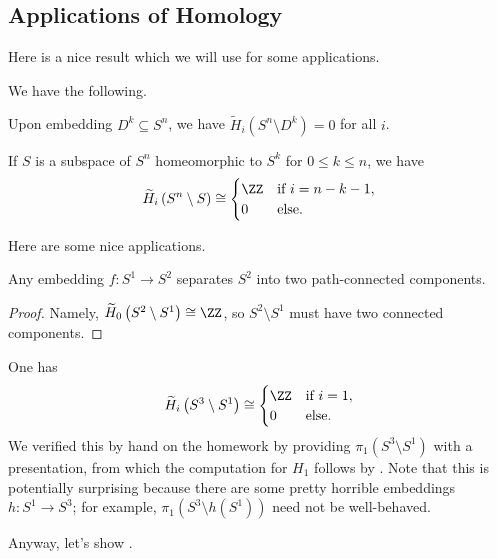 \documentclass[../notes.tex]{subfiles}
\begin{document}
\subsection{Applications of Homology}
Here is a nice result which we will use for some applications.
\begin{proposition} \label{prop:embed-sphere-homology}
	We have the following.
	\begin{listalph}
		\item Upon embedding $D^k\subseteq S^n$, we have $\widetilde H_i\left(S^n\setminus D^k\right)=0$ for all $i$.
		\item If $S$ is a subspace of $S^n$ homeomorphic to $S^k$ for $0\le k\le n$, we have
		\[\widetilde H_i\left(S^n\setminus S\right)\cong\begin{cases}
			\ZZ & \text{if }i=n-k-1, \\
			0 & \text{else}.
		\end{cases}\]
	\end{listalph}
\end{proposition}
Here are some nice applications.
\begin{corollary}
	Any embedding $f\colon S^1\to S^2$ separates $S^2$ into two path-connected components.
\end{corollary}
\begin{proof}
	Namely, $\widetilde H_0\left(S^2\setminus S^1\right)\cong\ZZ$, so $S^2\setminus S^1$ must have two connected components.
\end{proof}
\begin{example}
	One has
	\[\widetilde H_i\left(S^3\setminus S^1\right)\cong\begin{cases}
		\ZZ & \text{if }i=1, \\
		0 & \text{else}.
	\end{cases}\]
	We verified this by hand on the homework by providing $\pi_1\left(S^3\setminus S^1\right)$ with a presentation, from which the computation for $H_1$ follows by . Note that this is potentially surprising because there are some pretty horrible embeddings $h\colon S^1\to S^3$; for example, $\pi_1\left(S^3\setminus h\left(S^1\right)\right)$ need not be well-behaved.
\end{example}
Anyway, let's show .
\end{document}
